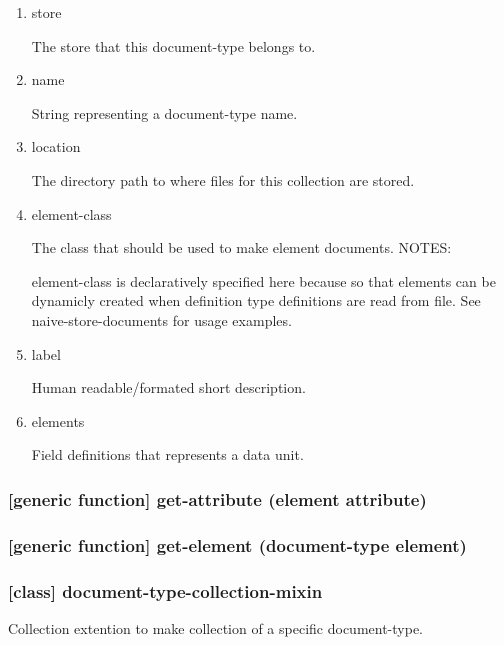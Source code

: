 \documentclass[11pt]{article}
\begin{document}
\begin{enumerate}
\item\relax [accessor] store
\label{sec:org148cc65}

The store that this document-type belongs to.

\item\relax [accessor] name
\label{sec:orgf0a9968}

String representing a document-type name.

\item\relax [accessor] location
\label{sec:org85ebe6f}

The directory path to where files for this collection are stored.

\item\relax [accessor] element-class
\label{sec:orgd8e4230}

The class that should be used to make element documents.
NOTES:

element-class is declaratively specified here because so that elements
can be dynamicly created when definition type definitions are read
from file. See naive-store-documents for usage examples.

\item\relax [accessor] label
\label{sec:orgfacaca6}

Human readable/formated short description.

\item\relax [accessor] elements
\label{sec:org3a0e0db}

Field definitions that represents a data unit.
\end{enumerate}

\subsubsection{[generic function] get-attribute (element attribute)}
\label{sec:org5bb9aec}

\subsubsection{[generic function] get-element (document-type element)}
\label{sec:orgf130285}


\subsubsection{[class] document-type-collection-mixin}
\label{sec:org44f6ef0}

Collection extention to make collection of a specific document-type.
\end{document}
